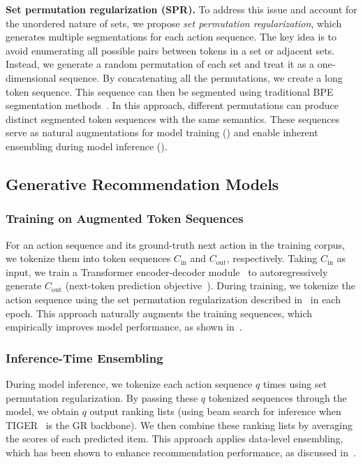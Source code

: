 \textbf{Set permutation regularization (SPR).} To address this issue and account for the unordered nature of sets, we propose \emph{set permutation regularization}, which generates multiple segmentations for each action sequence. The key idea is to avoid enumerating all possible pairs between tokens in a set or adjacent sets. Instead, we generate a random permutation of each set and treat it as a one-dimensional sequence. By concatenating all the permutations, we create a long token sequence. This sequence can then be segmented using traditional BPE segmentation methods~\cite{sennrich2016bpe}. In this approach, different permutations can produce distinct segmented token sequences with the same semantics. These sequences serve as natural augmentations for model training () and enable inherent ensembling during model inference ().


\subsection{Generative Recommendation Models}\label{subsec:model}


\subsubsection{Training on Augmented Token Sequences}\label{subsubsec:training}

For an action sequence and its ground-truth next action in the training corpus, we tokenize them into token sequences $C_{\text{in}}$ and $C_{\text{out}}$, respectively. Taking $C_{\text{in}}$ as input, we train a Transformer encoder-decoder module~\cite{raffel2020t5} to autoregressively generate $C_{\text{out}}$ (\eg next-token prediction objective~\cite{rajput2023tiger}). During training, we tokenize the action sequence using the set permutation regularization described in~ in each epoch. This approach naturally augments the training sequences, which empirically improves model performance, as shown in~.

\subsubsection{Inference-Time Ensembling}\label{subsubsec:inference}

During model inference, we tokenize each action sequence $q$ times using set permutation regularization. By passing these $q$ tokenized sequences through the model, we obtain $q$ output ranking lists (\eg using beam search for inference when TIGER~\cite{rajput2023tiger} is the GR backbone). We then combine these ranking lists by averaging the scores of each predicted item. This approach applies data-level ensembling, which has been shown to enhance recommendation performance, as discussed in~.
